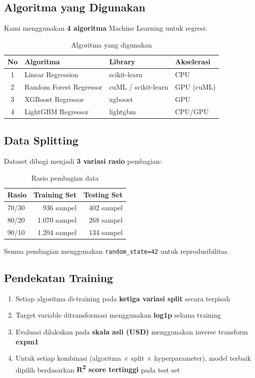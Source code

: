 \documentclass[12pt,a4paper]{article}
\begin{document}
\subsection{Algoritma yang Digunakan}
Kami menggunakan \textbf{4 algoritma} Machine Learning untuk regresi:

\begin{table}[h!]
\centering
\caption{Algoritma yang digunakan}
\begin{tabular}{clll}
\toprule
\textbf{No} & \textbf{Algoritma} & \textbf{Library} & \textbf{Akselerasi} \\
\midrule
1 & Linear Regression      & scikit-learn          & CPU \\
2 & Random Forest Regressor & cuML / scikit-learn  & GPU (cuML) \\
3 & XGBoost Regressor      & xgboost               & GPU \\
4 & LightGBM Regressor     & lightgbm              & CPU/GPU \\
\bottomrule
\end{tabular}
\end{table}

\subsection{Data Splitting}
Dataset dibagi menjadi \textbf{3 variasi rasio} pembagian:

\begin{table}[h!]
\centering
\caption{Rasio pembagian data}
\begin{tabular}{lrr}
\toprule
\textbf{Rasio} & \textbf{Training Set} & \textbf{Testing Set} \\
\midrule
70/30 & 936 sampel  & 402 sampel \\
80/20 & 1.070 sampel & 268 sampel \\
90/10 & 1.204 sampel & 134 sampel \\
\bottomrule
\end{tabular}
\end{table}

Semua pembagian menggunakan \texttt{random\_state=42} untuk reprodusibilitas.

\subsection{Pendekatan Training}
\begin{enumerate}
    \item Setiap algoritma di-training pada \textbf{ketiga variasi split} secara terpisah
    \item Target variable ditransformasi menggunakan \textbf{log1p} selama training
    \item Evaluasi dilakukan pada \textbf{skala asli (USD)} menggunakan inverse transform \textbf{expm1}
    \item Untuk setiap kombinasi (algoritma $\times$ split $\times$ hyperparameter), model terbaik dipilih berdasarkan \textbf{R\textsuperscript{2} score tertinggi} pada test set
\end{enumerate}
\end{document}
